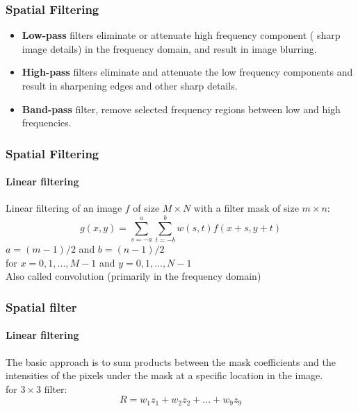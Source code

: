 \documentclass{beamer}
\begin{document}
\begin{frame}
\frametitle{Spatial Filtering}
\begin{itemize}
	\item \textbf{Low-pass} filters eliminate or attenuate high frequency component ({\color{blue} sharp image details}) in the frequency domain, and result in image {\color{blue} blurring}.
	\item \textbf{High-pass} filters eliminate and attenuate the low frequency components and result in {\color{blue} sharpening edges} and other sharp details. 
	\item \textbf{Band-pass} filter, remove selected frequency regions between low and high frequencies. 
\end{itemize}
\end{frame}
\begin{frame}
\frametitle{Spatial Filtering}
\framesubtitle{Linear filtering}
Linear filtering of an image $f$ of size $M \times N$ with a filter mask of size $m \times n$: 
$$g(x,y) = \sum^{a}_{s=-a}\sum^{b}_{t=-b} w(s,t)f(x+s, y+t)$$
\noindent $a = (m-1)/2$ and $b = (n-1)/2$\\
for $x = 0, 1, ..., M-1$ and $y = 0,1,..., N-1$\\
{\color{blue}Also called convolution (primarily in the frequency domain)}
\end{frame}
\begin{frame}
\frametitle{Spatial filter}
\framesubtitle{Linear filtering}
The basic approach is to sum products between the mask coefficients and the intensities of the pixels under the mask at a specific location in the image. \\
for $3 \times 3$ filter: 
$$R = w_{1}z_{1}+w_{2}z_{2}+...+w_{9}z_{9}$$
\end{frame}
\end{document}
